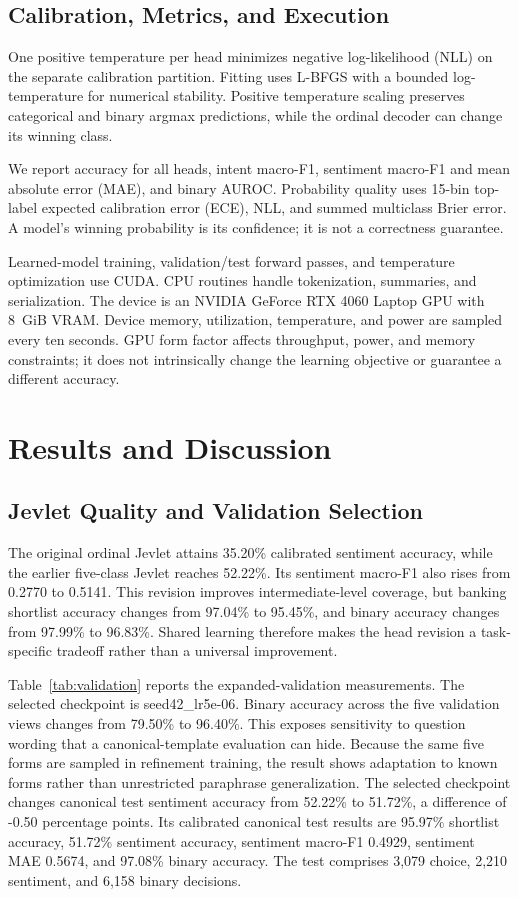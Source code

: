 \documentclass[conference]{IEEEtran}
\begin{document}
\subsection{Calibration, Metrics, and Execution}
One positive temperature per head minimizes negative log-likelihood (NLL) on the separate calibration partition. Fitting uses L-BFGS with a bounded log-temperature for numerical stability. Positive temperature scaling preserves categorical and binary argmax predictions, while the ordinal decoder can change its winning class.

We report accuracy for all heads, intent macro-F1, sentiment macro-F1 and mean absolute error (MAE), and binary AUROC. Probability quality uses 15-bin top-label expected calibration error (ECE), NLL, and summed multiclass Brier error. A model's winning probability is its confidence; it is not a correctness guarantee.

Learned-model training, validation/test forward passes, and temperature optimization use CUDA. CPU routines handle tokenization, summaries, and serialization. The device is an NVIDIA GeForce RTX 4060 Laptop GPU with 8~GiB VRAM. Device memory, utilization, temperature, and power are sampled every ten seconds. GPU form factor affects throughput, power, and memory constraints; it does not intrinsically change the learning objective or guarantee a different accuracy.

\section{Results and Discussion}
\subsection{Jevlet Quality and Validation Selection}
The original ordinal Jevlet attains 35.20\% calibrated sentiment accuracy, while the earlier five-class Jevlet reaches 52.22\%. Its sentiment macro-F1 also rises from 0.2770 to 0.5141. This revision improves intermediate-level coverage, but banking shortlist accuracy changes from 97.04\% to 95.45\%, and binary accuracy changes from 97.99\% to 96.83\%. Shared learning therefore makes the head revision a task-specific tradeoff rather than a universal improvement.

Table~\ref{tab:validation} reports the expanded-validation measurements. The selected checkpoint is seed42\_lr5e-06. Binary accuracy across the five validation views changes from 79.50\% to 96.40\%. This exposes sensitivity to question wording that a canonical-template evaluation can hide. Because the same five forms are sampled in refinement training, the result shows adaptation to known forms rather than unrestricted paraphrase generalization. The selected checkpoint changes canonical test sentiment accuracy from 52.22\% to 51.72\%, a difference of -0.50 percentage points. Its calibrated canonical test results are 95.97\% shortlist accuracy, 51.72\% sentiment accuracy, sentiment macro-F1 0.4929, sentiment MAE 0.5674, and 97.08\% binary accuracy. The test comprises 3,079 choice, 2,210 sentiment, and 6,158 binary decisions.
\end{document}

